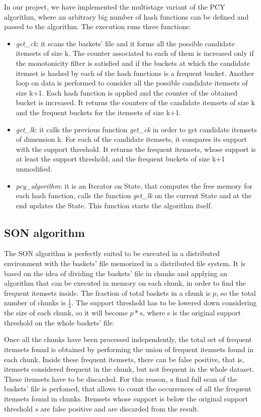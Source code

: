 \documentclass[conference,compsoc]{IEEEtran}
\theoremstyle{definition}
\begin{document}
In our project, we have implemented the multistage variant of the PCY algorithm, where an arbitrary big number of hash functions can be defined and passed to the algorithm. The execution runs three functions: 
\begin{itemize}
    \item \emph{get\_ck}: it scans the baskets' file and it forms all the possible candidate itemsets of size k. The counter associated to each of them is increased only if the monotonicity filter is satisfied and if the buckets at which the candidate itemset is hashed by each of the hash functions is a frequent bucket.
    Another loop on data is performed to consider all the possible candidate itemsets of size k+1. Each hash function is applied and the counter of the obtained bucket is increased. It returns the counters of the candidate itemsets of size k and the frequent buckets for the itemsets of size k+1.
    \item \emph{get\_lk}: it calls the previous function \emph{get\_ck} in order to get candidate itemsets of dimension k. For each of the candidate itemsets, it compares its support with the support threshold. It returns the frequent itemsets, whose support is at least the support threshold, and the frequent buckets of size k+1 unmodified. 
    \item \emph{pcy\_algorithm}: it is an Iterator on State, that computes the free memory for each hash function, calls the function \emph{get\_lk} on the current State and at the end updates the State. This function starts the algorithm itself.
\end{itemize}

\subsection{SON algorithm}

The SON algorithm is perfectly suited to be executed in a distributed environment with the baskets' file memorized in a distributed file system. It is based on the idea of dividing the baskets' file in chunks and applying an algorithm that can be executed in memory on each chunk, in order to find the frequent itemsets inside. The fraction of total baskets in a chunk is \(p\), so the total number of chunks is \(\frac{1}{o}\). The support threshold has to be lowered down considering the size of each chunk, so it will become \(p*s\), where s is the original support threshold on the whole baskets' file. 

Once all the chunks have been processed independently, the total set of frequent itemsets found is obtained by performing the union of frequent itemsets found in each chunk. Inside these frequent itemsets, there can be false positive, that is, itemsets considered frequent in the chunk, but not frequent in the whole dataset. These itemsets have to be discarded. For this reason, a final full scan of the baskets' file is perfomed, that allows to count the occurrences of all the frequent itemsets found in chunks. Itemsets whose support is below the original support threshold \(s\) are false positive and are discarded from the result. 
\end{document}
